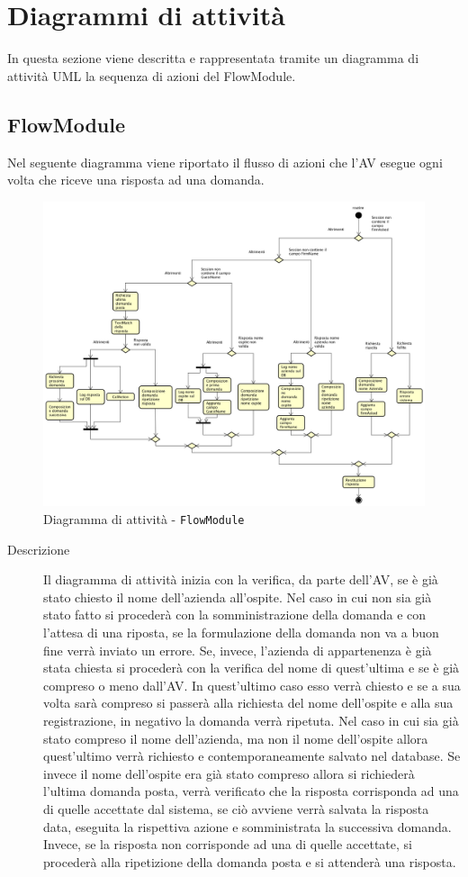 \documentclass[../DefinizioneDiProdotto_v2.0.0.tex]{subfiles}
\begin{document}
\section{Diagrammi di attività}
In questa sezione viene descritta e rappresentata tramite un diagramma di attività UML la sequenza di azioni del FlowModule.

\subsection{FlowModule}
Nel seguente diagramma viene riportato il flusso di azioni che l'AV esegue ogni volta che riceve una risposta ad una domanda.

\begin{figure}[!h]
	\centering
	\includegraphics[scale=0.3]{DiagrammiFlusso/FlussoFlowModule.png}
	\caption{Diagramma di attività - \texttt{FlowModule}}
\end{figure}
\begin{description}
	\item [Descrizione] Il diagramma di attività inizia con la verifica, da parte dell'AV, se è già stato chiesto il nome dell'azienda all'ospite. Nel caso in cui non sia già stato fatto si procederà con la somministrazione della domanda e con l'attesa di una riposta, se la formulazione della domanda non va a buon fine verrà inviato un errore. Se, invece,  l'azienda di appartenenza è già stata chiesta si procederà con la verifica del nome di quest'ultima e se è già compreso o meno dall'AV. In quest'ultimo caso esso verrà chiesto e se a sua volta sarà compreso si passerà alla richiesta del nome dell'ospite e alla sua registrazione, in negativo la domanda verrà ripetuta. Nel caso in cui sia già stato compreso il nome dell'azienda, ma non il nome dell'ospite allora quest'ultimo verrà richiesto e contemporaneamente salvato nel database. Se invece il nome dell'ospite era già stato compreso allora si richiederà l'ultima domanda posta, verrà verificato che la risposta corrisponda ad una di quelle accettate dal sistema, se ciò avviene verrà salvata la risposta data, eseguita la rispettiva azione e somministrata la successiva domanda. Invece, se la risposta non corrisponde ad una di quelle accettate, si procederà alla ripetizione della domanda posta e si attenderà una risposta.
\end{description}
\end{document}
